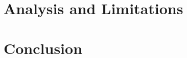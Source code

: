 \documentclass{article}
\begin{document}
\section{Analysis and Limitations}

\section{Conclusion}


\end{document}

